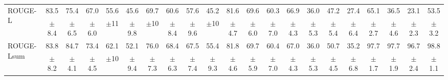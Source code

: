 \documentclass[main.tex]{subfiles}
\begin{document}
\begin{table}[t]
{\begin{tabular}{l|cccccccccc@{\hskip 2pt}|cccccccccc}
\multirow{2}{*}{ROUGE-L} & {\normalsize 83.5} & {\normalsize 75.4} & {\normalsize 67.0} & {\normalsize 55.6} & {\normalsize 45.6} & {\normalsize 69.7} & {\normalsize 60.6} & {\normalsize 57.6} & {\normalsize 45.2} & {\normalsize 81.6} & {\normalsize 69.6} & {\normalsize 60.3} & {\normalsize 66.9} & {\normalsize 36.0} & {\normalsize 47.2} & {\normalsize 27.4} & {\normalsize 65.1} & {\normalsize 36.5} & {\normalsize 23.1} & {\normalsize 53.5} \\
& {\footnotesize $\pm$8.4} & {\footnotesize $\pm$6.5} & {\footnotesize $\pm$6.0} & {\footnotesize $\pm$11} & {\footnotesize $\pm$9.8} & {\footnotesize $\pm$10} & {\footnotesize $\pm$8.4} & {\footnotesize $\pm$9.6} & {\footnotesize $\pm$10} & {\footnotesize $\pm$4.7} & {\footnotesize $\pm$6.0} & {\footnotesize $\pm$7.0} & {\footnotesize $\pm$4.3} & {\footnotesize $\pm$5.3} & {\footnotesize $\pm$5.4} & {\footnotesize $\pm$6.4} & {\footnotesize $\pm$2.7} & {\footnotesize $\pm$4.6} & {\footnotesize $\pm$2.3} & {\footnotesize $\pm$3.2} \\
\cline{2-21}

\multirow{2}{*}{ROUGE-Lsum} & {\normalsize 83.8} & {\normalsize 84.7} & {\normalsize 73.4} & {\normalsize 62.1} & {\normalsize 52.1} & {\normalsize 76.0} & {\normalsize 68.4} & {\normalsize 67.5} & {\normalsize 55.4} & {\normalsize 81.8} & {\normalsize 69.7} & {\normalsize 60.4} & {\normalsize 67.0} & {\normalsize 36.0} & {\normalsize 50.7} & {\normalsize 35.2} & {\normalsize 97.7} & {\normalsize 97.7} & {\normalsize 96.7} & {\normalsize 98.8} \\
& {\footnotesize $\pm$8.2} & {\footnotesize $\pm$4.1} & {\footnotesize $\pm$4.5} & {\footnotesize $\pm$10} & {\footnotesize $\pm$9.4} & {\footnotesize $\pm$7.3} & {\footnotesize $\pm$6.3} & {\footnotesize $\pm$7.4} & {\footnotesize $\pm$9.3} & {\footnotesize $\pm$4.6} & {\footnotesize $\pm$5.9} & {\footnotesize $\pm$7.0} & {\footnotesize $\pm$4.3} & {\footnotesize $\pm$5.3} & {\footnotesize $\pm$4.5} & {\footnotesize $\pm$6.8} & {\footnotesize $\pm$1.7} & {\footnotesize $\pm$1.9} & {\footnotesize $\pm$2.4} & {\footnotesize $\pm$1.1} \\
\hline


\end{tabular}}
\end{table}
\end{document}
